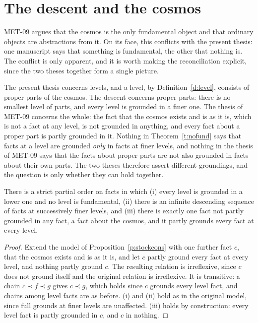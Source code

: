 \documentclass{situationist-preprint}
\begin{document}
\section{The descent and the cosmos}\label{s:cosmos}

MET-09 argues that the cosmos is the only fundamental object and that ordinary objects are abstractions from it. On its face, this conflicts with the present thesis: one manuscript says that something is fundamental, the other that nothing is. The conflict is only apparent, and it is worth making the reconciliation explicit, since the two theses together form a single picture.

The present thesis concerns levels, and a level, by Definition~\ref{d:level}, consists of proper parts of the cosmos. The descent concerns proper parts: there is no smallest level of parts, and every level is grounded in a finer one. The thesis of MET-09 concerns the whole: the fact that the cosmos exists and is as it is, which is not a fact at any level, is not grounded in anything, and every fact about a proper part is partly grounded in it. Nothing in Theorem~\ref{t:nofund} says that facts at a level are grounded \emph{only} in facts at finer levels, and nothing in the thesis of MET-09 says that the facts about proper parts are not also grounded in facts about their own parts. The two theses therefore assert different groundings, and the question is only whether they can hold together.

\begin{proposition}[Compatibility]\label{p:compat}
There is a strict partial order on facts in which (i) every level is grounded in a lower one and no level is fundamental, (ii) there is an infinite descending sequence of facts at successively finer levels, and (iii) there is exactly one fact not partly grounded in any fact, a fact about the cosmos, and it partly grounds every fact at every level.
\end{proposition}

\begin{proof}
Extend the model of Proposition~\ref{p:stockcons} with one further fact $c$, that the cosmos exists and is as it is, and let $c$ partly ground every fact at every level, and nothing partly ground $c$. The resulting relation is irreflexive, since $c$ does not ground itself and the original relation is irreflexive. It is transitive: a chain $c \prec f \prec g$ gives $c \prec g$, which holds since $c$ grounds every level fact, and chains among level facts are as before. (i) and (ii) hold as in the original model, since full grounds at finer levels are unaffected. (iii) holds by construction: every level fact is partly grounded in $c$, and $c$ in nothing.
\end{proof}
\end{document}
